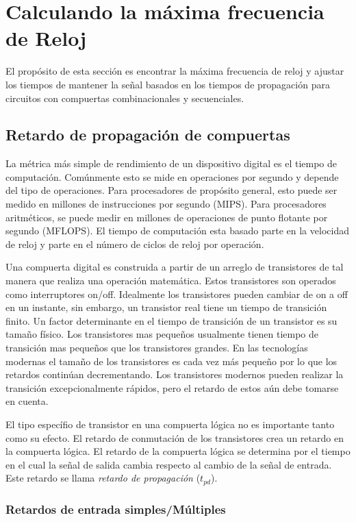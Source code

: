 \documentclass[12pt]{book}
\theoremstyle{definition}
\theoremstyle{remark}
\theoremstyle{plain}
\begin{document}
\section{Calculando la máxima frecuencia de Reloj}
El propósito de esta sección es encontrar la máxima frecuencia de reloj y ajustar los tiempos de mantener la señal basados en los tiempos de propagación para circuitos con compuertas combinacionales y secuenciales.

\subsection{Retardo de propagación de compuertas}

La métrica más simple de rendimiento de un dispositivo digital es el tiempo de computación. Comúnmente esto se mide en operaciones por segundo y depende del tipo de operaciones. Para procesadores de propósito general, esto puede ser medido en millones de instrucciones por segundo (MIPS). Para procesadores aritméticos, se puede medir en millones de operaciones de punto flotante por segundo (MFLOPS). El tiempo de computación esta basado parte en la velocidad de reloj y parte en el número de ciclos de reloj por operación. 

Una compuerta digital es construida a partir de un arreglo de transistores de tal manera que realiza una operación matemática. Estos transistores son operados como interruptores on/off. Idealmente los transistores pueden cambiar de on a off en un instante, sin embargo, un transistor real tiene un tiempo de transición finito. Un factor determinante en el tiempo de transición de un transistor es su tamaño físico. Los transistores mas pequeños usualmente tienen tiempo de transición mas pequeños que los transistores grandes. En las tecnologías modernas el tamaño de los transistores es cada vez más pequeño por lo que los retardos continúan decrementando. Los transistores modernos pueden realizar la transición excepcionalmente rápidos, pero el retardo de estos aún debe tomarse en cuenta.

El tipo específio de transistor en una compuerta lógica no es importante tanto como su efecto. El retardo de conmutación de los transistores crea un retardo en la compuerta lógica. El retardo de la compuerta lógica se determina por el tiempo en el cual la señal de salida cambia respecto al cambio de la señal de entrada. Este retardo se llama \emph{retardo de propagación} ($t_{pd}$).

\subsubsection{Retardos de entrada simples/Múltiples}
\end{document}

